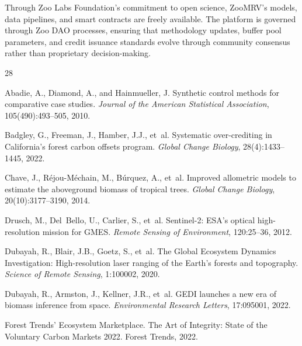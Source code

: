\documentclass[11pt,a4paper]{article}
\begin{document}
Through Zoo Labs Foundation's commitment to open science, ZooMRV's
models, data pipelines, and smart contracts are freely available. The
platform is governed through Zoo DAO processes, ensuring that
methodology updates, buffer pool parameters, and credit issuance
standards evolve through community consensus rather than proprietary
decision-making.





\begin{thebibliography}{28}

Abadie, A., Diamond, A., and Hainmueller, J.
\newblock Synthetic control methods for comparative case studies.
\newblock \emph{Journal of the American Statistical Association},
  105(490):493--505, 2010.

Badgley, G., Freeman, J., Hamber, J.J., et~al.
\newblock Systematic over-crediting in California's forest carbon offsets
  program.
\newblock \emph{Global Change Biology}, 28(4):1433--1445, 2022.

Chave, J., R{\'e}jou-M{\'e}chain, M., B{\'u}rquez, A., et~al.
\newblock Improved allometric models to estimate the aboveground biomass of
  tropical trees.
\newblock \emph{Global Change Biology}, 20(10):3177--3190, 2014.

Drusch, M., Del~Bello, U., Carlier, S., et~al.
\newblock Sentinel-2: ESA's optical high-resolution mission for GMES.
\newblock \emph{Remote Sensing of Environment}, 120:25--36, 2012.

Dubayah, R., Blair, J.B., Goetz, S., et~al.
\newblock The Global Ecosystem Dynamics Investigation: High-resolution laser
  ranging of the Earth's forests and topography.
\newblock \emph{Science of Remote Sensing}, 1:100002, 2020.

Dubayah, R., Armston, J., Kellner, J.R., et~al.
\newblock GEDI launches a new era of biomass inference from space.
\newblock \emph{Environmental Research Letters}, 17:095001, 2022.

Forest Trends' Ecosystem Marketplace.
\newblock The Art of Integrity: State of the Voluntary Carbon Markets 2022.
\newblock Forest Trends, 2022.


\end{thebibliography}
\end{document}
